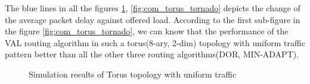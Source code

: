 The blue lines in all the figures \ref{fig:torus_tornado}, \ref{fig:com_torus_tornado} depicts the change of the average packet delay against offered load. According to the first sub-figure in the figure \ref{fig:com_torus_tornado}, we can know that the performance of the VAL routing algorithm in such a torus(8-ary, 2-dim) topology with uniform traffic pattern better than all the other three routing algorithms(DOR, MIN-ADAPT).


\begin{figure}[H]
    \centering
    \caption{Simulation results of Torus topology with uniform traffic}
    \label{fig:torus_tornado}
\end{figure}


